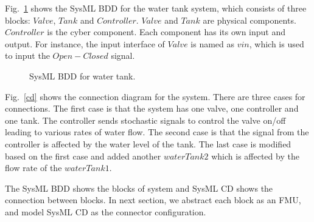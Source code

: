 Fig.~\ref{myad} shows the SysML BDD for the water tank system, which consists of three blocks: $Valve$, $Tank$ and $Controller$. $Valve$ and $Tank$ are physical components. $Controller$ is the cyber component. Each component has its own input and output. For instance, the input interface of $Valve$ is named as $vin$, which is used to input the $Open-Closed$ signal. 
\begin{figure}[htbp]
	\caption{SysML BDD for water tank.}
	\label{myad}
\end{figure}

Fig.~\ref{cd} shows the connection diagram for the system. There are three cases for connections. The first case is that the system has one valve, one controller and one tank. The controller sends stochastic signals to control the valve on/off leading to various rates of water flow. The second case is that the signal from the controller is affected by the water level of the tank. The last case is modified based on the first case and added another $waterTank2$ which is affected by the flow rate of the $waterTank1$.

\begin{figure}[htbp]
\end{figure}
The SysML BDD shows the blocks of system and SysML CD shows the connection between blocks. In next section, we abstract each block as an FMU, and model SysML CD as the connector configuration.

